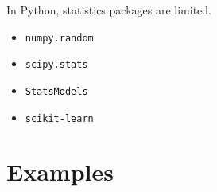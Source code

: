 \documentclass{beamer}
\begin{document}
{\begin{multicols}{2}
\begin{itemize}
\end{itemize}
\end{multicols}
\vspace{20pt}
In Python, statistics packages are limited.
\begin{multicols}{2}
\begin{itemize}
\item \texttt{numpy.random} %
\item \texttt{scipy.stats} %
\item \texttt{StatsModels} %
\item \texttt{scikit-learn} %
\end{itemize}
\end{multicols}

}


\section[Examples]{Examples}
\end{document}
